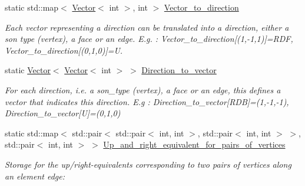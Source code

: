 \begin{DoxyCompactItemize}
static std\+::map$<$ \hyperlink{classoomph_1_1Vector}{Vector}$<$ int $>$, int $>$ \hyperlink{classoomph_1_1OcTree_aec83bade91057d89aa3896274cb96b7e}{Vector\+\_\+to\+\_\+direction}
\begin{DoxyCompactList}\small\item\em Each vector representing a direction can be translated into a direction, either a son type (vertex), a face or an edge. E.\+g. \+: Vector\+\_\+to\+\_\+direction\mbox{[}(1,-\/1,1)\mbox{]}=R\+DF, Vector\+\_\+to\+\_\+direction\mbox{[}(0,1,0)\mbox{]}=U. \end{DoxyCompactList}\item 
static \hyperlink{classoomph_1_1Vector}{Vector}$<$ \hyperlink{classoomph_1_1Vector}{Vector}$<$ int $>$ $>$ \hyperlink{classoomph_1_1OcTree_adf813fbb9cffe89fb51f3c8ccd3083ca}{Direction\+\_\+to\+\_\+vector}
\begin{DoxyCompactList}\small\item\em For each direction, i.\+e. a son\+\_\+type (vertex), a face or an edge, this defines a vector that indicates this direction. E.\+g \+: Direction\+\_\+to\+\_\+vector\mbox{[}R\+DB\mbox{]}=(1,-\/1,-\/1), Direction\+\_\+to\+\_\+vector\mbox{[}U\mbox{]}=(0,1,0) \end{DoxyCompactList}\item 
static std\+::map$<$ std\+::pair$<$ std\+::pair$<$ int, int $>$, std\+::pair$<$ int, int $>$ $>$, std\+::pair$<$ int, int $>$ $>$ \hyperlink{classoomph_1_1OcTree_a88cff579697781e1ec50c86517feec77}{Up\+\_\+and\+\_\+right\+\_\+equivalent\+\_\+for\+\_\+pairs\+\_\+of\+\_\+vertices}
\begin{DoxyCompactList}\small\item\em Storage for the up/right-\/equivalents corresponding to two pairs of vertices along an element edge\+: \end{DoxyCompactList}\end{DoxyCompactItemize}
